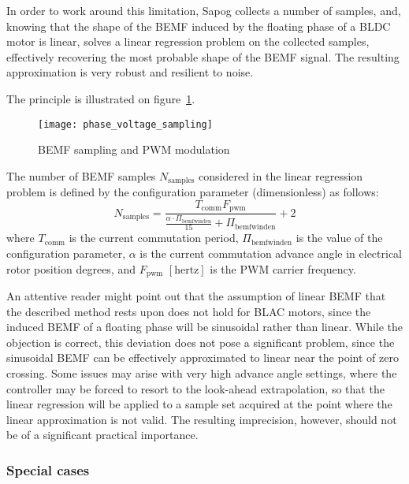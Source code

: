 \documentclass{zubaxdoc}
\begin{document}
	In order to work around this limitation, Sapog collects a number of samples, and,
	knowing that the shape of the BEMF induced by the floating phase of a BLDC motor is linear,
	solves a linear regression problem on the collected samples, effectively recovering the most probable
	shape of the BEMF signal.
	The resulting approximation is very robust and resilient to noise.
	
	The principle is illustrated on figure~\ref{phase_voltage_sampling}.
	
	\begin{figure}[hbtp]
		\centering
		\texttt{[image: phase\_voltage\_sampling]}
		\caption{BEMF sampling and PWM modulation
			\label{phase_voltage_sampling}}
	\end{figure}
	
	The number of BEMF samples $N_\text{samples}$ considered in the linear regression problem is defined by
	the configuration parameter  (dimensionless) as follows:
	\begin{equation}
		N_\text{samples} =
		\frac{T_{\text{comm}} F_{\text{pwm}}}{\frac{\alpha\cdot{}\Pi_\text{bemfwinden}}{15} + \Pi_\text{bemfwinden}} + 2
	\end{equation}
	where $T_{\text{comm}}$ is the current commutation period,
	$\Pi_\text{bemfwinden}$ is the value of the configuration parameter,
	$\alpha$ is the current commutation advance angle in electrical rotor position degrees,
	and $F_{\text{pwm}}$ $\left[\text{hertz}\right]$ is the PWM carrier frequency.
	
	An attentive reader might point out that the assumption of linear BEMF that the described method rests
	upon does not hold for BLAC motors, since the induced BEMF of a floating phase will be sinusoidal rather
	than linear.
	While the objection is correct, this deviation does not pose a significant problem, since the sinusoidal
	BEMF can be effectively approximated to linear near the point of zero crossing.
	Some issues may arise with very high advance angle settings, where the controller may be forced to resort to
	the look-ahead extrapolation, so that the linear regression will be applied to a sample set acquired
	at the point where the linear approximation is not valid.
	The resulting imprecision, however, should not be of a significant practical importance.
	
	\subsubsection{Special cases}
	
\end{document}
